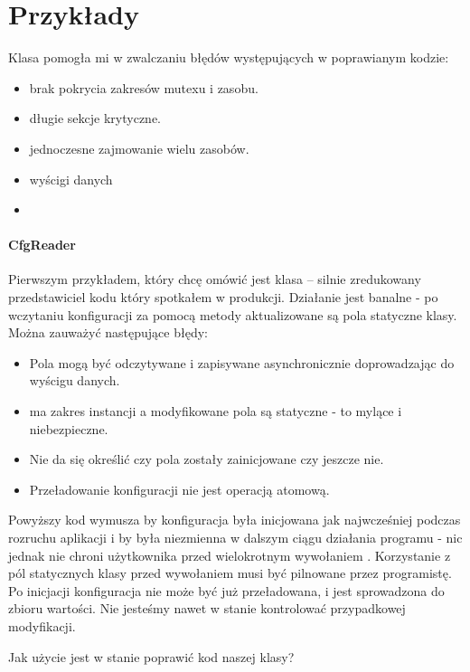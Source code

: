 \section{Przykłady}\label{sec:examples}
Klasa  pomogła mi w zwalczaniu błędów występujących w poprawianym kodzie:
\begin{itemize}
\item brak pokrycia zakresów mutexu i zasobu.
\item długie sekcje krytyczne.
\item jednoczesne zajmowanie wielu zasobów.
\item wyścigi danych
\item {}
\end{itemize}

\paragraph{CfgReader}
Pierwszym przykładem, który chcę omówić jest klasa  -- silnie zredukowany przedstawiciel kodu który spotkałem w produkcji. Działanie jest banalne - po wczytaniu konfiguracji za pomocą metody  aktualizowane są pola statyczne klasy.
Można zauważyć następujące błędy:
\begin{itemize}
\item Pola mogą być odczytywane i zapisywane asynchronicznie doprowadzając do wyścigu danych.
\item {} ma zakres instancji a modyfikowane pola są statyczne - to mylące i niebezpieczne.
\item Nie da się określić czy pola zostały zainicjowane czy jeszcze nie.
\item Przeładowanie konfiguracji nie jest operacją atomową.
\end{itemize}
Powyższy kod wymusza by konfiguracja była inicjowana jak najwcześniej podczas rozruchu aplikacji i by była niezmienna w dalszym ciągu działania programu - nic jednak nie chroni użytkownika przed wielokrotnym wywołaniem . Korzystanie z pól statycznych klasy przed wywołaniem  musi być pilnowane przez programistę. Po inicjacji konfiguracja nie może być już przeładowana, i jest sprowadzona do zbioru wartości. Nie jesteśmy nawet w stanie kontrolować przypadkowej modyfikacji.

Jak użycie  jest w stanie poprawić kod naszej klasy? 

